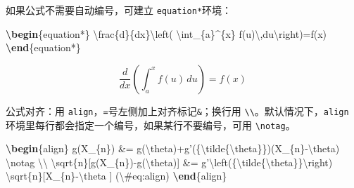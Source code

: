 \documentclass[]{article}
\newenvironment{Shaded}{\begin{snugshade}}{\end{snugshade}}
\newcommand{\ExtensionTok}[1]{#1}
\newcommand{\KeywordTok}[1]{\textcolor[rgb]{0.13,0.29,0.53}{\textbf{#1}}}
\newcommand{\NormalTok}[1]{#1}
\newcommand{\SpecialCharTok}[1]{\textcolor[rgb]{0.00,0.00,0.00}{#1}}
\newcommand{\SpecialStringTok}[1]{\textcolor[rgb]{0.31,0.60,0.02}{#1}}
\begin{document}
如果公式不需要自动编号，可建立 \texttt{equation*}环境：

\begin{Shaded}
\begin{Highlighting}[]
\KeywordTok{\textbackslash{}begin}\NormalTok{\{}\ExtensionTok{equation*}\NormalTok{\}}\SpecialStringTok{ }
\SpecialCharTok{\textbackslash{}frac}\SpecialStringTok{\{d\}\{dx\}}\SpecialCharTok{\textbackslash{}left}\SpecialStringTok{( }\SpecialCharTok{\textbackslash{}int}\SpecialStringTok{_\{a\}^\{x\} f(u)}\SpecialCharTok{\textbackslash{},}\SpecialStringTok{du}\SpecialCharTok{\textbackslash{}right}\SpecialStringTok{)=f(x)}
\KeywordTok{\textbackslash{}end}\NormalTok{\{}\ExtensionTok{equation*}\NormalTok{\} }
\end{Highlighting}
\end{Shaded}

\begin{equation*}
\frac{d}{dx}\left( \int_{a}^{x} f(u)\,du\right)=f(x)
\end{equation*}

公式对齐：用
\texttt{align}，\texttt{=}号左侧加上对齐标记\texttt{\&}；换行用
\texttt{\textbackslash{}\textbackslash{}}。默认情况下，\texttt{align}
环境里每行都会指定一个编号，如果某行不要编号，可用
\texttt{\textbackslash{}notag}。

\begin{Shaded}
\begin{Highlighting}[]
\KeywordTok{\textbackslash{}begin}\NormalTok{\{}\ExtensionTok{align}\NormalTok{\}}\SpecialStringTok{ }
\SpecialStringTok{g(X_\{n\}) &= g(}\SpecialCharTok{\textbackslash{}theta}\SpecialStringTok{)+g'(\{}\SpecialCharTok{\textbackslash{}tilde}\SpecialStringTok{\{}\SpecialCharTok{\textbackslash{}theta}\SpecialStringTok{\}\})(X_\{n\}-}\SpecialCharTok{\textbackslash{}theta}\SpecialStringTok{) }\SpecialCharTok{\textbackslash{}notag}\SpecialStringTok{ }\SpecialCharTok{\textbackslash{}\textbackslash{}}
\SpecialCharTok{\textbackslash{}sqrt}\SpecialStringTok{\{n\}[g(X_\{n\})-g(}\SpecialCharTok{\textbackslash{}theta}\SpecialStringTok{)] &= g'}\SpecialCharTok{\textbackslash{}left}\SpecialStringTok{(\{}\SpecialCharTok{\textbackslash{}tilde}\SpecialStringTok{\{}\SpecialCharTok{\textbackslash{}theta}\SpecialStringTok{\}\}}\SpecialCharTok{\textbackslash{}right}\SpecialStringTok{)}
\SpecialStringTok{  }\SpecialCharTok{\textbackslash{}sqrt}\SpecialStringTok{\{n\}[X_\{n\}-}\SpecialCharTok{\textbackslash{}theta}\SpecialStringTok{ ] (}\SpecialCharTok{\textbackslash{}#}\SpecialStringTok{eq:align)}
\KeywordTok{\textbackslash{}end}\NormalTok{\{}\ExtensionTok{align}\NormalTok{\} }
\end{Highlighting}
\end{Shaded}
\end{document}
